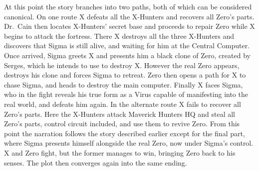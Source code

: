 At this point the story branches into two paths, both of which can be considered canonical. On one route X defeats all the X-Hunters and recovers all Zero's parts. Dr.~Cain then locates X-Hunters' secret base and proceeds to repair  Zero while X begins to attack the fortress. There X destroys all the three X-Hunters and discovers that Sigma is still alive, and waiting for him at the Central Computer. Once arrived, Sigma greets X and presents him a black clone of Zero, created by Serges, which he intends to use to destroy X. However the real Zero appears, destroys his clone and forces Sigma to retreat. Zero then opens a path for X to chase Sigma, and heads to destroy the main computer. Finally X faces Sigma, who in the fight reveals his true form as a Virus capable of manifesting into the real world, and defeats him again. In the alternate route X fails to recover all Zero's parts. Here the X-Hunters attack Maverick Hunters HQ and steal all Zero's parts, control circuit included, and use them to revive Zero. From this point the narration follows the story described earlier except for the final part, where Sigma presents himself alongside the real Zero, now under Sigma's control. X and Zero fight, but the former manages to win, bringing Zero back to his senses. The plot then converges again into the same ending.

